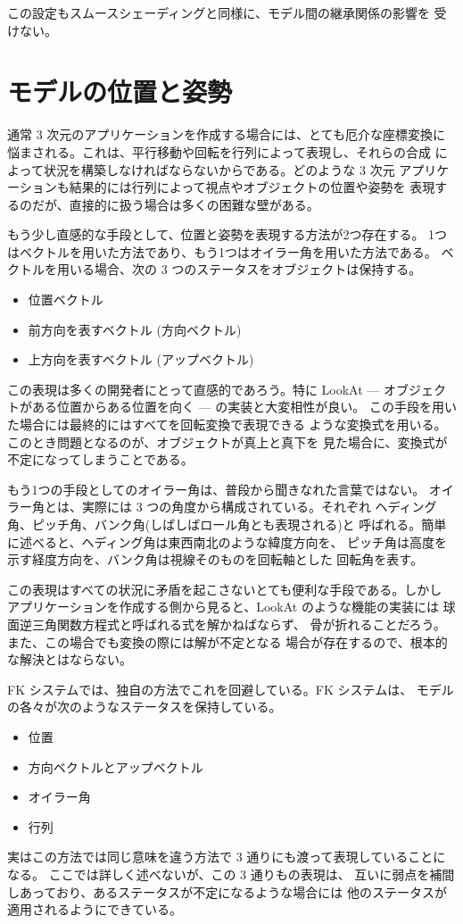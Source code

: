 この設定もスムースシェーディングと同様に、モデル間の継承関係の影響を
受けない。
\section{モデルの位置と姿勢}
通常 3 次元のアプリケーションを作成する場合には、とても厄介な座標変換に
悩まされる。これは、平行移動や回転を行列によって表現し、それらの合成
によって状況を構築しなければならないからである。どのような 3 次元
アプリケーションも結果的には行列によって視点やオブジェクトの位置や姿勢を
表現するのだが、直接的に扱う場合は多くの困難な壁がある。

もう少し直感的な手段として、位置と姿勢を表現する方法が2つ存在する。
1つはベクトルを用いた方法であり、もう1つはオイラー角を用いた方法である。
ベクトルを用いる場合、次の 3 つのステータスをオブジェクトは保持する。
\begin{itemize}
 \item 位置ベクトル
 \item 前方向を表すベクトル (方向ベクトル)
 \item 上方向を表すベクトル (アップベクトル)
\end{itemize}
この表現は多くの開発者にとって直感的であろう。特に LookAt ---
オブジェクトがある位置からある位置を向く --- の実装と大変相性が良い。
この手段を用いた場合には最終的にはすべてを回転変換で表現できる
ような変換式を用いる。このとき問題となるのが、オブジェクトが真上と真下を
見た場合に、変換式が不定になってしまうことである。

もう1つの手段としてのオイラー角は、普段から聞きなれた言葉ではない。
オイラー角とは、実際には 3 つの角度から構成されている。それぞれ
ヘディング角、ピッチ角、バンク角(しばしばロール角とも表現される)と
呼ばれる。簡単に述べると、ヘディング角は東西南北のような緯度方向を、
ピッチ角は高度を示す経度方向を、バンク角は視線そのものを回転軸とした
回転角を表す。

この表現はすべての状況に矛盾を起こさないとても便利な手段である。しかし
アプリケーションを作成する側から見ると、LookAt のような機能の実装には
球面逆三角関数方程式と呼ばれる式を解かねばならず、
骨が折れることだろう。また、この場合でも変換の際には解が不定となる
場合が存在するので、根本的な解決とはならない。

FK システムでは、独自の方法でこれを回避している。FK システムは、
モデルの各々が次のようなステータスを保持している。
\begin{itemize}
 \item 位置
 \item 方向ベクトルとアップベクトル
 \item オイラー角
 \item 行列
\end{itemize}
実はこの方法では同じ意味を違う方法で 3 通りにも渡って表現していることになる。
ここでは詳しく述べないが、この 3 通りもの表現は、
互いに弱点を補間しあっており、あるステータスが不定になるような場合には
他のステータスが適用されるようにできている。

